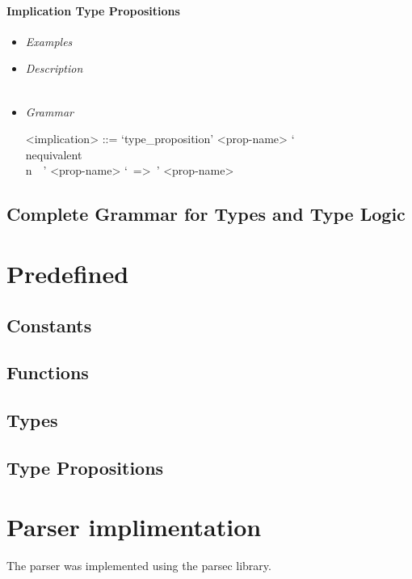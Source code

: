 \documentclass{article}
\begin{document}
\paragraph{Implication Type Propositions}

\begin{itemize}
\item \textit{Examples}
\item \textit{Description} \\\\
\item \textit{Grammar}
\begin{grammar}
<implication> ::= 
`type_proposition' <prop-name>
`\\nequivalent\\n\ \ ' <prop-name> `\ =>\ ' <prop-name>
\end{grammar} 
\end{itemize}

\subsection{Complete Grammar for Types and Type Logic}

\section{Predefined}

\subsection{Constants}

\subsection{Functions}

\subsection{Types}

\subsection{Type Propositions}

\section{Parser implimentation}

The parser was implemented using the parsec library.
\end{document}
